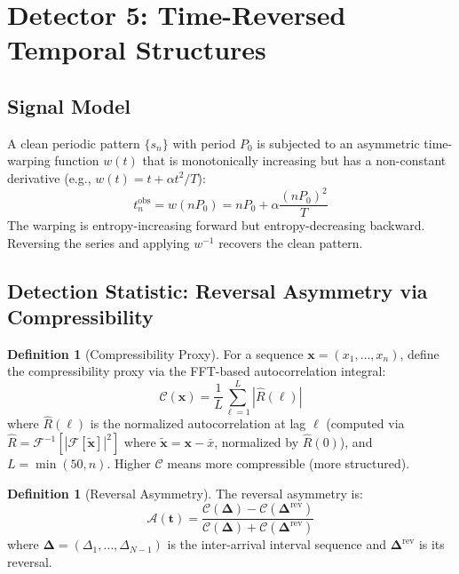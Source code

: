 \documentclass[11pt]{article}
\theoremstyle{definition}
\newtheorem{definition}[theorem]{Definition}
\begin{document}
\section{Detector 5: Time-Reversed Temporal Structures}

\subsection{Signal Model}

A clean periodic pattern $\{s_n\}$ with period $P_0$ is subjected to an asymmetric time-warping function $w(t)$ that is monotonically increasing but has a non-constant derivative (e.g., $w(t) = t + \alpha t^2/T$):
\begin{equation}
t_n^{\text{obs}} = w(n P_0) = n P_0 + \alpha \frac{(n P_0)^2}{T}
\end{equation}
The warping is entropy-increasing forward but entropy-decreasing backward. Reversing the series and applying $w^{-1}$ recovers the clean pattern.

\subsection{Detection Statistic: Reversal Asymmetry via Compressibility}

\begin{definition}[Compressibility Proxy]
For a sequence $\mathbf{x} = (x_1, \ldots, x_n)$, define the compressibility proxy via the FFT-based autocorrelation integral:
\begin{equation}
\mathcal{C}(\mathbf{x}) = \frac{1}{L} \sum_{\ell=1}^{L} |\hat{R}(\ell)|
\end{equation}
where $\hat{R}(\ell)$ is the normalized autocorrelation at lag $\ell$ (computed via $\hat{R} = \mathcal{F}^{-1}[|\mathcal{F}[\tilde{\mathbf{x}}]|^2]$ where $\tilde{\mathbf{x}} = \mathbf{x} - \bar{x}$, normalized by $\hat{R}(0)$), and $L = \min(50, n)$. Higher $\mathcal{C}$ means more compressible (more structured).
\end{definition}

\begin{definition}[Reversal Asymmetry]
The reversal asymmetry is:
\begin{equation}
\mathcal{A}(\mathbf{t}) = \frac{\mathcal{C}(\boldsymbol{\Delta}) - \mathcal{C}(\boldsymbol{\Delta}^{\text{rev}})}{\mathcal{C}(\boldsymbol{\Delta}) + \mathcal{C}(\boldsymbol{\Delta}^{\text{rev}})}
\end{equation}
where $\boldsymbol{\Delta} = (\Delta_1, \ldots, \Delta_{N-1})$ is the inter-arrival interval sequence and $\boldsymbol{\Delta}^{\text{rev}}$ is its reversal.
\end{definition}
\end{document}

